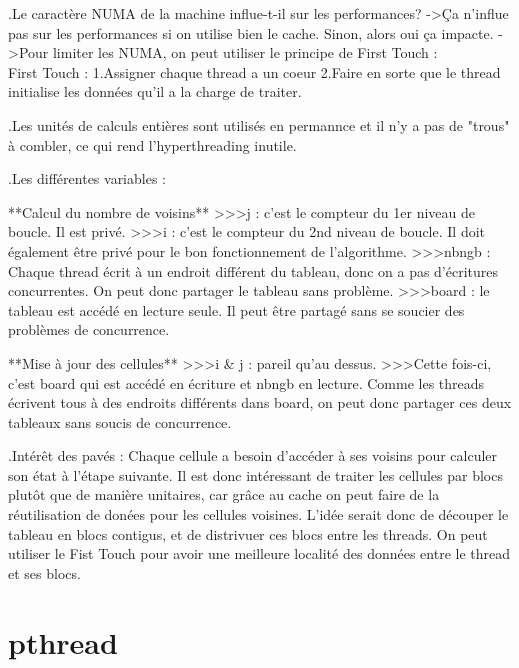 .Le caractère NUMA de la machine influe-t-il sur les performances?
->Ça n'influe pas sur les performances si on utilise bien le cache. Sinon, alors oui ça impacte.
->Pour limiter les NUMA, on peut utiliser le principe de First Touch :\\

First Touch :
1.Assigner chaque thread a un coeur
2.Faire en sorte que le thread initialise les données qu'il a la charge de traiter.

.Les unités de calculs entières sont utilisés en permannce et il n'y a pas de "trous" à combler, ce qui rend l'hyperthreading inutile.

.Les différentes variables :

**Calcul du nombre de voisins**
>>>j : c'est le compteur du 1er niveau de boucle. Il est privé.
>>>i : c'est le compteur du 2nd niveau de boucle. Il doit également être privé pour le bon fonctionnement de l'algorithme.
>>>nbngb : Chaque thread écrit à un endroit différent du tableau, donc on a pas d'écritures concurrentes. On peut donc partager le tableau sans problème.
>>>board : le tableau est accédé en lecture seule. Il peut être partagé sans se soucier des problèmes de concurrence.

**Mise à jour des cellules**
>>>i & j : pareil qu'au dessus.
>>>Cette fois-ci, c'est board qui est accédé en écriture et nbngb en lecture. Comme les threads écrivent tous à des endroits différents dans board, on peut donc partager ces deux tableaux sans soucis de concurrence.

.Intérêt des pavés : Chaque cellule a besoin d'accéder à ses voisins pour calculer son état à l'étape suivante. Il est donc intéressant de traiter les cellules par blocs plutôt que de manière unitaires, car grâce au cache on peut faire de la réutilisation de donées pour les cellules voisines. L'idée serait donc de découper le tableau en blocs contigus, et de distrivuer ces blocs entre les threads. On peut utiliser le Fist Touch pour avoir une meilleure localité des données entre le thread et ses blocs.

\section*{pthread}
